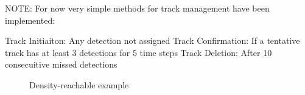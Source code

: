 NOTE: For now very simple methods for track management have been implemented:

Track Initiaiton: Any detection not assigned
Track Confirmation: If a tentative track has at least 3 detections for 5 time steps
Track Deletion: After 10 consecuitive missed detections

\begin{figure}[h!]
	\centering
	
	\caption{Density-reachable example}
\end{figure} 
